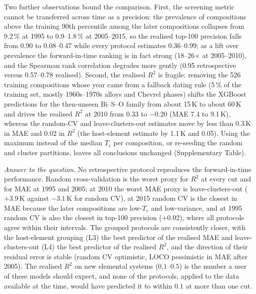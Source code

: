 Two further observations bound the comparison. First, the screening metric cannot be transferred across time as a precision: the
prevalence of compositions above the training 90th percentile among the later compositions collapses from 9.2\,\% at 1995 to
0.9--1.8\,\% at 2005--2015, so the realised top-100 precision falls from 0.90 to 0.08--0.47 while every protocol estimates
0.36--0.99; as a lift over prevalence the forward-in-time ranking is in fact strong (18--26$\times$ at 2005--2010), and the Spearman
rank correlation degrades more gently (0.95 retrospective versus 0.57--0.78 realised). Second, the realised $R^2$ is fragile:
removing the 526 training compositions whose year came from a fallback dating rule (5\,\% of the training set, mostly 1960s--1970s
alloys and Chevrel phases) shifts the XGBoost predictions for the then-unseen Bi--S--O family from about 15\,K to about 60\,K and drives the realised
$R^2$ at 2010 from $0.33$ to $-0.20$ (MAE 7.4 to 9.1\,K), whereas the random-CV and leave-clusters-out estimates move by less than 0.3\,K in MAE
and 0.02 in $R^2$ (the host-element estimate by 1.1\,K and 0.05). Using the maximum instead of the median $T_c$ per composition, or re-seeding the random and cluster partitions,
leaves all conclusions unchanged (Supplementary Table).

\emph{Answer to the question.} No retrospective protocol reproduces the forward-in-time performance. Random cross-validation is the
worst proxy for $R^2$ at every cut and for MAE at 1995 and 2005; at 2010 the worst MAE proxy is leave-clusters-out
($+3.9$\,K against $-3.1$\,K for random CV), at 2015 random CV is the closest in MAE because the later compositions are
low-$T_c$ and low-variance, and at 1995 random CV is also the closest in top-100 precision (+0.02), where all protocols agree
within their intervals. The
grouped protocols are consistently closer, with the host-element grouping (L3) the best predictor of the realised MAE and
leave-clusters-out (L4) the best predictor of the realised $R^2$, and the direction of their residual error is stable (random CV
optimistic, LOCO pessimistic in MAE after 2005). The realised $R^2$ on new elemental systems ($0.1$--$0.5$) is the number a user of
these models should expect, and none of the protocols, applied to the data available at the time, would have predicted it to
within $0.1$ at more than one cut.

